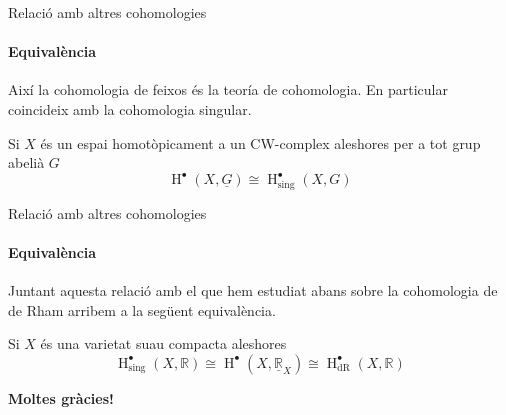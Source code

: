 \documentclass[notheorems, aspectratio=169]{beamer}
\begin{document}
\begin{frame}{Relació amb altres cohomologies}
  \framesubtitle{Equivalència}
  Així la cohomologia de feixos \alert<1>{és} la teoría de cohomologia.
  En particular coincideix amb la cohomologia singular.
  \begin{corollary}
    Si \(X\) és un espai homotòpicament a un CW-complex aleshores per a tot grup abelià \(G\)
    \begin{equation*}
      \operatorname{H}^{\bullet}(X, \underline{G}) \cong \operatorname{H}^{\bullet}_{\text{sing}}(X, G)
    \end{equation*}
  \end{corollary}
\end{frame}


\begin{frame}[fragile]{Relació amb altres cohomologies}
  \framesubtitle{Equivalència}
  Juntant aquesta relació amb el que hem estudiat abans sobre la cohomologia de de Rham arribem a la següent equivalència.
  \begin{corollary}
    Si \(X\) és una varietat suau compacta aleshores
    \begin{equation*}
      \operatorname{H}^{\bullet}_{\text{sing}}(X, \mathbb{R}) \cong \operatorname{H}^{\bullet}(X, \underline{\mathbb{R}}_{X}) \cong \operatorname{H}^{\bullet}_{\text{dR}}(X, \mathbb{R})
    \end{equation*}
  \end{corollary}
\end{frame}

\begin{frame}
  \centering
  {\Huge\bfseries\sffamily\color{accentcolor} Moltes gràcies!}
\end{frame}
\end{document}
